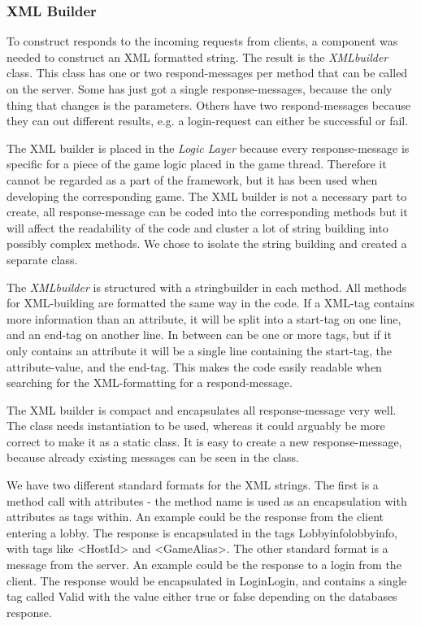 \subsubsection{XML Builder}
\label{sec:xmlbuilderimpl}
To construct responds to the incoming requests from clients, a component was needed to construct an XML formatted string. The result is the \textit{XMLbuilder} class. This class has one or two respond-messages per method that can be called on the server. Some has just got a single response-messages, because the only thing that changes is the parameters. Others have two respond-messages because they can out different results, e.g. a login-request can either be successful or fail. 

The XML builder is placed in the \textit{Logic Layer} because every response-message is specific for a piece of the game logic placed in the game thread. Therefore it cannot be regarded as a part of the framework, but it has been used when developing the corresponding game. The XML builder is not a necessary part to create, all response-message can be coded into the corresponding methods but it will affect the readability of the code and cluster a lot of string building into possibly complex methods. We chose to isolate the string building and created a separate class.

The \textit{XMLbuilder} is structured with a stringbuilder in each method. All methods for XML-building are formatted the same way in the code. If a XML-tag contains more information than an attribute, it will be split into a start-tag on one line, and an end-tag on another line. In between can be one or more tags, but if it only contains an attribute it will be a single line containing the start-tag, the attribute-value, and the end-tag. This makes the code easily readable when searching for the XML-formatting for a respond-message. 

The XML builder is compact and encapsulates all response-message very well. The class needs instantiation to be used, whereas it could arguably be more correct to make it as a static class. It is easy to create a new response-message, because already existing messages can be seen in the class.

We have two different standard formats for the XML strings. The first is a method call with attributes - the method name is used as an encapsulation with attributes as tags within. An example could be the response from the client entering a lobby. The response is encapsulated in the tags \<Lobbyinfo\>\<\/lobbyinfo\>, with tags like <HostId> and <GameAlias>. The other standard format is a message from the server. An example could be the response to a login from the client. The response would be encapsulated in \<Login\>\<\/Login\>, and contains a single tag called \<Valid\> with the value either true or false depending on the databases response.
